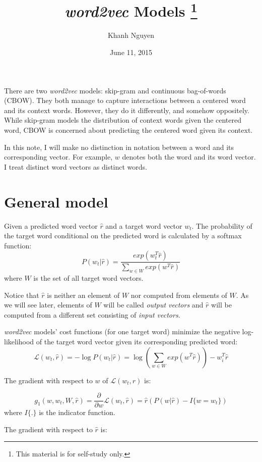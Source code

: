 \documentclass[11pt,letterpaper]{article}
\title{
	\emph{word2vec} Models \footnote{This material is for self-study only.}
}
\author{
	Khanh Nguyen
}
\date{June 11, 2015}
\begin{document}
\maketitle

There are two\emph{ word2vec} models: skip-gram and continuous bag-of-words (CBOW). They both manage to capture interactions between a centered word and its context words. However, they do it differently, and somehow oppositely. While skip-gram models the distribution of context words given the centered word, CBOW is concerned about predicting the centered word given its context. 

In this note, I will make no distinction in notation between a word and its corresponding vector. For example, $w$ denotes both the word and its word vector. I treat distinct word vectors as distinct words. 

\section{General model}

Given a predicted word vector $\hat{r}$ and a target word vector $w_t$. The probability of the target word conditional on the predicted word is calculated by a softmax function:
$$ P(w_t | \hat{r}) = \frac{exp(w_t^{T}\hat{r})}{\sum_{w \in W} exp(w^{T}\hat{r}) }$$ where  $W$ is the set of all target word vectors. 

Notice that $\hat{r}$ is neither an element of $W$ nor computed from elements of $W$. As we will see later, elements of $W$ will be called \emph{output vectors} and $\hat{r}$ will be computed from a different set consisting of \emph{input vectors}. 

\emph{word2vec} models' cost functions (for one target word) minimize the negative log-likelihood of the target word vector given its corresponding predicted word:
$$ \mathcal{L}(w_t, \hat{r}) = -\log P(w_t | \hat{r}) = \log \left(\sum_{w \in W} exp(w^T \hat{r})   \right) - w_i^T \hat{r} $$ 

The gradient with respect to $w$ of $\mathcal{L}(w_t, \hat{r})$ is:

\begin{equation}
 g_1(w, w_t, W, \hat{r}) = \frac{\partial}{\partial w} \mathcal{L}(w_t, \hat{r}) = \hat{r}(P(w | \hat{r}) - I\{w = w_t\})
\end{equation} where $I\{.\}$ is the indicator function.

The gradient with respect to $\hat{r}$ is:
\end{document}
